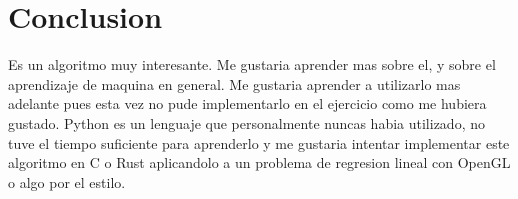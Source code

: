 \documentclass{article}
\begin{document}
\section*{Conclusion}
Es un algoritmo muy interesante. Me gustaria aprender mas sobre el, y sobre el aprendizaje de
maquina en general. Me gustaria aprender a utilizarlo mas adelante pues esta vez no pude
implementarlo en el ejercicio como me hubiera gustado. Python es un lenguaje que personalmente
nuncas habia utilizado, no tuve el tiempo suficiente para aprenderlo y me gustaria intentar implementar
este algoritmo en C o Rust aplicandolo a un problema de regresion lineal con OpenGL o algo por el estilo.
\end{document}
